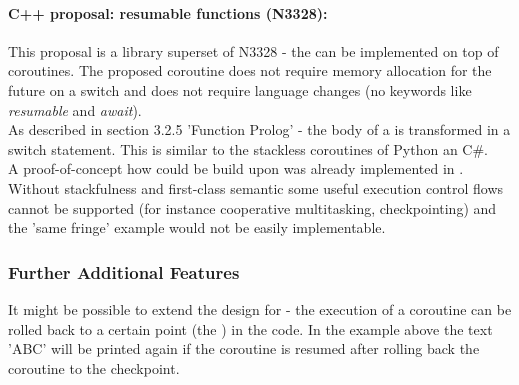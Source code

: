 \paragraph*{C++ proposal: resumable functions (N3328\cite{n3328}):}
This proposal is a library superset of N3328 - the \resumfn can be implemented
on top of coroutines. The proposed coroutine does not require memory allocation
for the future on a switch and does not require language changes (no keywords
like \textit{resumable} and \textit{await}).\\
As described in section 3.2.5 'Function Prolog' - the body of a \resumfn is
transformed in a switch statement. This is similar to the stackless coroutines
of Python an C\#.\\
A proof-of-concept how \await could be build upon \boostcoroutine was already
implemented in \awaitemu.\\
\newline
Without stackfulness and first-class semantic some useful execution control
flows cannot be supported (for instance cooperative multitasking,
checkpointing) and the 'same fringe' example would not be easily implementable.

\subsubsection*{Further Additional Features}
It might be possible to extend the design for \checkpointing - the execution of
a coroutine can be rolled back to a certain point (the \checkpoint) in the code.
In the example above the text 'ABC' will be printed again if the coroutine
is resumed after rolling back the coroutine to the checkpoint.
